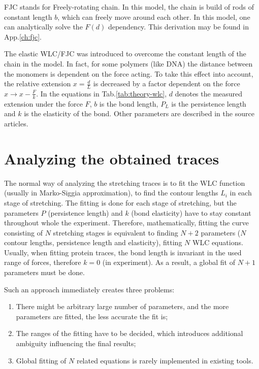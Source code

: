 FJC stands for Freely-rotating chain.
In this model, the chain is build of rods of constant length $b$, which can freely move around each other.
In this model, one can analytically solve the $F(d)$ dependency.
This derivation may be found in App.\ref{ch:fjc}.

The elastic WLC/FJC was introduced to overcome the constant length of the chain in the model.
In fact, for some polymers (like DNA) the distance between the monomers is dependent on the force acting.
To take this effect into account, the relative extension $x=\frac{d}{L}$ is decreased by a factor dependent on the force $x\rightarrow x-\frac{F}{k}$.
In the equations in Tab.\ref{tab:theory-wlc}, $d$ denotes the measured extension under the force $F$, $b$ is the bond length, $P_L$ is the persistence length and $k$ is the elasticity of the bond.
Other parameters are described in the source articles.

\section{Analyzing the obtained traces}
\label{sec:theory-analysis}
The normal way of analyzing the stretching traces is to fit the WLC function (usually in Marko-Siggia approximation), to find the contour lengths $L_i$ in each stage of stretching.
The fitting is done for each stage of stretching, but the parameters $P$ (persistence length) and $k$ (bond elasticity) have to stay constant throughout whole the experiment.
Therefore, mathematically, fitting the curve consisting of $N$ stretching stages is equivalent to finding $N+2$ parameters ($N$ contour lengths, persistence length and elasticity), fitting $N$ WLC equations.
Usually, when fitting protein traces, the bond length is invariant in the used range of forces, therefore $k=0$ (in experiment).
As a result, a global fit of $N+1$ parameters must be done.

Such an approach immediately creates three problems:
\begin{enumerate}
    \item There might be arbitrary large number of parameters, and the more parameters are fitted, the less accurate the fit is;
    \item The ranges of the fitting have to be decided, which introduces additional ambiguity influencing the final results;
    \item Global fitting of $N$ related equations is rarely implemented in existing tools.
\end{enumerate}


